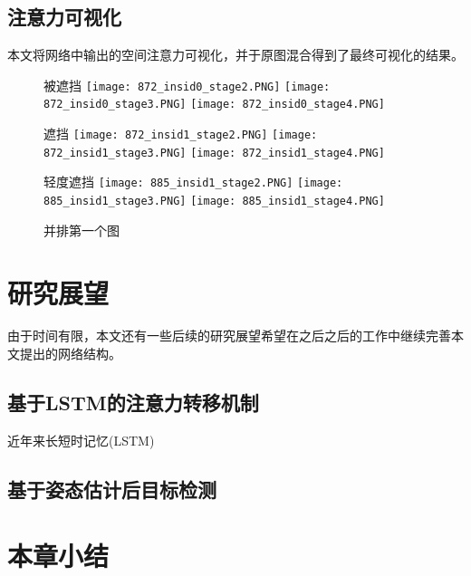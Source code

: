 \subsection{注意力可视化}
\label{sec:weaksuperatten}
本文将网络中输出的空间注意力可视化，并于原图混合得到了最终可视化的结果。
\label{subsec:attenexp}
\begin{figure}
	\begin{minipage}{\textwidth}
		被遮挡
		\centering
		\texttt{[image: 872\_insid0\_stage2.PNG]}
		\texttt{[image: 872\_insid0\_stage3.PNG]}
		\texttt{[image: 872\_insid0\_stage4.PNG]}
	\end{minipage}
	\vskip0.2cm
	\begin{minipage}{\textwidth}
		遮挡
		\centering
		\texttt{[image: 872\_insid1\_stage2.PNG]}
		\texttt{[image: 872\_insid1\_stage3.PNG]}
		\texttt{[image: 872\_insid1\_stage4.PNG]}
	\end{minipage}
	\begin{minipage}{\textwidth}
		轻度遮挡
		\centering
		\texttt{[image: 885\_insid1\_stage2.PNG]}
		\texttt{[image: 885\_insid1\_stage3.PNG]}
		\texttt{[image: 885\_insid1\_stage4.PNG]}
	\end{minipage}
	\label{fig:parallel1}
	\caption{并排第一个图}
\end{figure}

\section{研究展望}
\label{sec:future}
由于时间有限，本文还有一些后续的研究展望希望在之后之后的工作中继续完善本文提出的网络结构。
\subsection{基于LSTM的注意力转移机制}
\label{subsec:lstmatten}
近年来长短时记忆(LSTM)
\subsection{基于姿态估计后目标检测}
\label{subsec:semisuperdetect}

\section{本章小结}